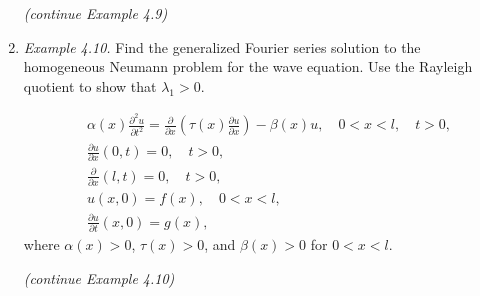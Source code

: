 \begin{enumerate}
\newpage
\textit{(continue Example 4.9)}

\newpage


\item \textit{Example 4.10.} Find the generalized Fourier series solution to the homogeneous Neumann problem for the wave equation. Use the Rayleigh quotient to show that $\lambda _{1} > 0$.

\[
\begin{aligned}
    & \alpha(x)\frac{\partial^{2} u}{\partial t ^{2}} = \frac{\partial }{\partial x} \left( \tau(x) \frac{\partial u}{\partial x} \right) - \beta(x)u, \quad 0<x<l , \quad t>0, \\
    & \frac{\partial u}{\partial x}(0,t)=0, \quad t>0,\\
    & \frac{\partial }{\partial x}(l,t)=0, \quad t>0, \\
    & u(x,0)=f(x), \quad 0<x<l,\\
    & \frac{\partial u}{\partial t}(x,0)=g(x),
\end{aligned}
\]
where $\alpha(x) > 0$, $\tau (x) > 0$, and $\beta(x) > 0$ for $0 < x < l$.


\newpage
\textit{(continue Example 4.10)}


\end{enumerate}




